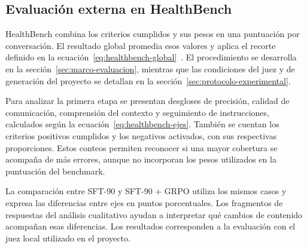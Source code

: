 \subsection{Evaluación externa en HealthBench}
\label{sec:metricas-benchmark}
HealthBench combina los criterios cumplidos y sus pesos en una puntuación por conversación. El resultado global promedia esos valores y aplica el recorte definido en la ecuación~\ref{eq:healthbench-global}~\cite{arora2025healthbench,openai2026healthbenchcode}. El procedimiento se desarrolla en la sección~\ref{sec:marco-evaluacion}, mientras que las condiciones del juez y de generación del proyecto se detallan en la sección~\ref{sec:protocolo-experimental}.

Para analizar la primera etapa se presentan desgloses de precisión, calidad de comunicación, comprensión del contexto y seguimiento de instrucciones, calculados según la ecuación~\ref{eq:healthbench-ejes}. También se cuentan los criterios positivos cumplidos y los negativos activados, con sus respectivas proporciones. Estos conteos permiten reconocer si una mayor cobertura se acompaña de más errores, aunque no incorporan los pesos utilizados en la puntuación del benchmark.

La comparación entre SFT-90 y SFT-90 + GRPO utiliza los mismos casos y expresa las diferencias entre ejes en puntos porcentuales. Los fragmentos de respuestas del análisis cualitativo ayudan a interpretar qué cambios de contenido acompañan esas diferencias. Los resultados corresponden a la evaluación con el juez local utilizado en el proyecto.
